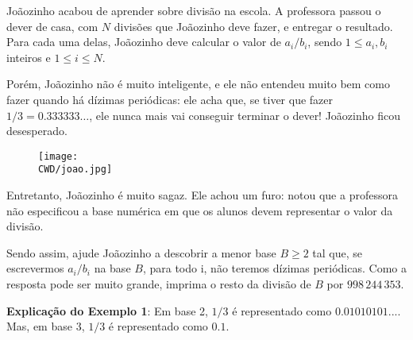 %

Joãozinho acabou de aprender sobre divisão na escola. A professora passou o dever de casa, com $N$ divisões que Joãozinho deve fazer, e entregar o resultado. Para cada uma delas, Joãozinho deve calcular o valor de $a_i / b_i$, sendo $1 \leq a_i, b_i$ inteiros e $1 \leq i \leq N$.

Porém, Joãozinho não é muito inteligente, e ele não entendeu muito bem como fazer quando há dízimas periódicas: ele acha que, se tiver que fazer $1 / 3 = 0.333333\dots$, ele nunca mais vai conseguir terminar o dever! Joãozinho ficou desesperado.
\begin{figure}[H]
    \centering
    \texttt{[image: \\CWD/joao.jpg]}
\end{figure}
Entretanto, Joãozinho é muito sagaz. Ele achou um furo: notou que a professora não especificou a base numérica em que os alunos devem representar o valor da divisão.

Sendo assim, ajude Joãozinho a descobrir a menor base $B \geq 2$ tal que, se escrevermos $a_i / b_i$ na base $B$, para todo i, não teremos dízimas periódicas. Como a resposta pode ser muito grande, imprima o resto da divisão de $B$ por $998\,244\,353$.

%
%


%
%



\sampleio

\bigskip
\textbf{Explicação do Exemplo 1}: Em base 2, $1/3$ é representado como $0.01010101...$. Mas, em base 3, $1/3$ é representado como $0.1$.
